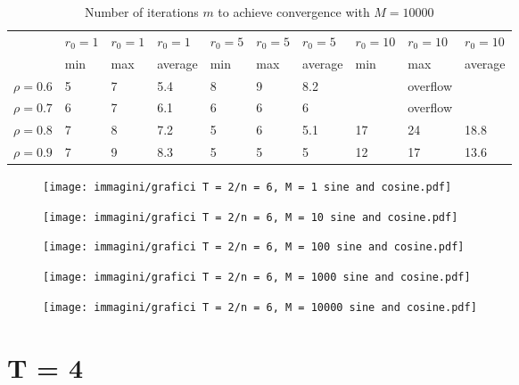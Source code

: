 \documentclass[a4paper,11pt,openright]{report}
\begin{document}
\begin{table}[H]
\centering
\addtolength{\leftskip}{-1.5cm}
\addtolength{\rightskip}{-1.5cm}
\begin{tabular}{|c|lllllllll|}
\hline
$ $ & $r_0 = 1$ & $r_0 = 1$ & $r_0 = 1$ & $r_0 = 5$ & $r_0 = 5$ & $r_0 = 5$ & $r_0 = 10$ & $r_0 = 10$ & $r_0 = 10$  \\
$ $ & min & max & average & min & max & average & min & max & average \\ 
\hline
$\rho = 0.6$ & 5 & 7 & 5.4 & 8 & 9 & 8.2 &  & overflow &  \\

$\rho = 0.7$ & 6 & 7 & 6.1 & 6 & 6 & 6 &  & overflow &  \\

$\rho = 0.8$ & 7 & 8 & 7.2 & 5 & 6 & 5.1 & 17 & 24 & 18.8 \\

$\rho = 0.9$ & 7 & 9 & 8.3 & 5 & 5 & 5 & 12 & 17 & 13.6\\
\hline
\end{tabular}
\caption{Number of iterations $m$ to achieve convergence with $M = 10000$}
\end{table}
\begin{figure}[H]
\centering
\texttt{[image: immagini/grafici T = 2/n = 6, M = 1 sine and cosine.pdf]}
\end{figure}
\begin{figure}[H]
\centering
\texttt{[image: immagini/grafici T = 2/n = 6, M = 10 sine and cosine.pdf]}
\end{figure}
\begin{figure}[H]
\centering
\texttt{[image: immagini/grafici T = 2/n = 6, M = 100 sine and cosine.pdf]}
\end{figure}
\begin{figure}[H]
\centering
\texttt{[image: immagini/grafici T = 2/n = 6, M = 1000 sine and cosine.pdf]}
\end{figure}
\begin{figure}[H]
\centering
\texttt{[image: immagini/grafici T = 2/n = 6, M = 10000 sine and cosine.pdf]}
\end{figure}
\newpage
\section{T = 4}
\end{document}

